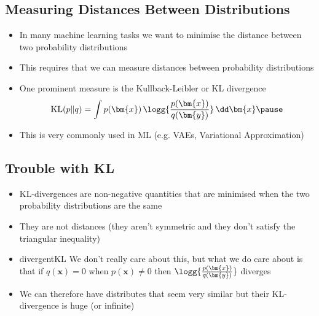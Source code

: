 \begin{slide}
\section{Measuring Distances Between Distributions}

\begin{PauseHighLight}
  \begin{itemize}
  \item In many machine learning tasks we want to minimise the
    distance between two probability distributions\pause
  \item This requires that we can measure distances between
    probability distributions\pause
  \item One prominent measure is the Kullback-Leibler or KL divergence
    \begin{align*}
      \mathrm{KL}(p\|q) = \int p(\bm{x}) \,
      \logg{\frac{p(\bm{x})}{q(\bm{y})}} \, \dd \bm{x}\pause
    \end{align*}
  \item This is very commonly used in ML (e.g. VAEs, Variational
    Approximation)\pause
  \end{itemize}
\end{PauseHighLight}

\end{slide}


\begin{slide}
\section[-2]{Trouble with KL}

\begin{PauseHighLight}
  \begin{itemize}
  \item KL-divergences are non-negative quantities that are minimised
    when the two probability distributions are the same\pause
  \item They are not distances (they aren't symmetric and they don't
    satisfy the triangular inequality)\pause
  \item
    \begin{rightImage}{divergentKL}
      We don't really care about this, but what we do care about is
    that if $q(\bm{x})=0$ when $p(\bm{x})\neq 0$ then
    $\logg{\frac{p(\bm{x})}{q(\bm{y})}}$ diverges\pause
    \end{rightImage}
  \item We can therefore have distributes that seem very similar but
    their KL-divergence is huge (or infinite)\pause
  \end{itemize}
\end{PauseHighLight}

\end{slide}

